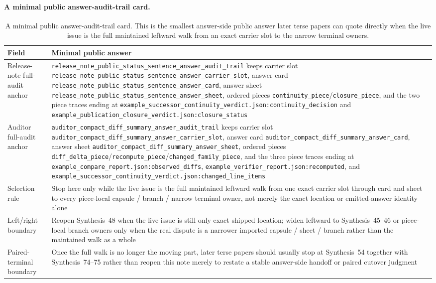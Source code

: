 \documentclass[11pt]{article}
\begin{document}
\paragraph{A minimal public answer-audit-trail card.}
\begin{table}[t]
\centering
\small
\begin{tabularx}{\linewidth}{@{}lX@{}}
\toprule
Field & Minimal public answer \\
\midrule
Release-note full-audit anchor & \nolinkurl{release_note_public_status_sentence_answer_audit_trail} keeps carrier slot \nolinkurl{release_note_public_status_sentence_answer_carrier_slot}, answer card \nolinkurl{release_note_public_status_sentence_answer_card}, answer sheet \nolinkurl{release_note_public_status_sentence_answer_sheet}, ordered pieces \nolinkurl{continuity_piece}/\nolinkurl{closure_piece}, and the two piece traces ending at \nolinkurl{example_successor_continuity_verdict.json:continuity_decision} and \nolinkurl{example_publication_closure_verdict.json:closure_status} \\
Auditor full-audit anchor & \nolinkurl{auditor_compact_diff_summary_answer_audit_trail} keeps carrier slot \nolinkurl{auditor_compact_diff_summary_answer_carrier_slot}, answer card \nolinkurl{auditor_compact_diff_summary_answer_card}, answer sheet \nolinkurl{auditor_compact_diff_summary_answer_sheet}, ordered pieces \nolinkurl{diff_delta_piece}/\nolinkurl{recompute_piece}/\nolinkurl{changed_family_piece}, and the three piece traces ending at \nolinkurl{example_compare_report.json:observed_diffs}, \nolinkurl{example_verifier_report.json:recomputed}, and \nolinkurl{example_successor_continuity_verdict.json:changed_line_items} \\
Selection rule & Stop here only while the live issue is the full maintained leftward walk from one exact carrier slot through card and sheet to every piece-local capsule / branch / narrow terminal owner, not merely the exact location or emitted-answer identity alone \\
Left/right boundary & Reopen Synthesis~48 when the live issue is still only exact shipped location; widen leftward to Synthesis~45--46 or piece-local branch owners only when the real dispute is a narrower imported capsule / sheet / branch rather than the maintained walk as a whole \\
Paired-terminal boundary & Once the full walk is no longer the moving part, later terse papers should usually stop at Synthesis~54 together with Synthesis~74--75 rather than reopen this note merely to restate a stable answer-side handoff or paired cutover judgment \\
\bottomrule
\end{tabularx}
\caption{A minimal public answer-audit-trail card. This is the smallest answer-side public answer later terse papers can quote directly when the live issue is the full maintained leftward walk from an exact carrier slot to the narrow terminal owners.}
\label{tab:minimal-public-answer-audit-trail-card}
\end{table}
\end{document}
